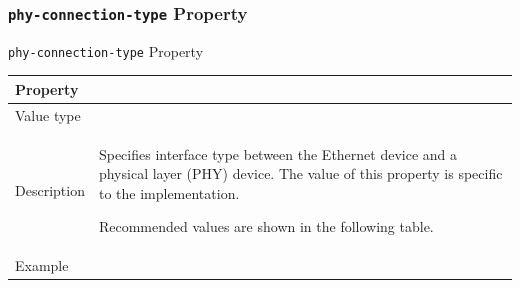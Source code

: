 \documentclass[a4paper,10pt,oneside]{sphinxmanual}
\begin{document}
\subsubsection{\texttt{phy-connection-type} Property}
\label{device-bindings:phy-connection-type-property}

\begin{threeparttable}
\capstart\caption{\texttt{phy-connection-type} Property}\label{device-bindings:id14}
\begin{tabulary}{\linewidth}{| l J |}
\hline
\textsf{\relax 
Property
} & \textsf{\relax 
{}
}\\
\hline
Value type
 & 
\\
\hline
Description
 & 
Specifies interface type between the Ethernet device and a
physical layer (PHY) device. The value of this property is
specific to the implementation.

Recommended values are shown in the following table.
\\
\hline
Example
 & 
\\
\hline\end{tabulary}

\end{threeparttable}
\end{document}
